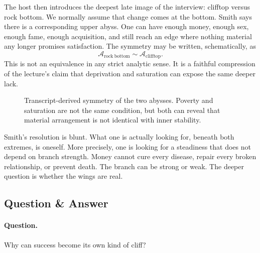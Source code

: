 The host then introduces the deepest late image of the interview: clifftop versus rock bottom. We normally assume that change comes at the bottom. Smith says there is a corresponding upper abyss. One can have enough money, enough sex, enough fame, enough acquisition, and still reach an edge where nothing material any longer promises satisfaction. The symmetry may be written, schematically, as
\begin{equation}
\mathcal A_{\mathrm{rock\ bottom}}
\sim
\mathcal A_{\mathrm{clifftop}}.
\end{equation}
This is not an equivalence in any strict analytic sense. It is a faithful compression of the lecture's claim that deprivation and saturation can expose the same deeper lack.

\begin{figure}[h]
\centering
{}
\caption{Transcript-derived symmetry of the two abysses. Poverty and saturation are not the same condition, but both can reveal that material arrangement is not identical with inner stability.}
\end{figure}

Smith's resolution is blunt. What one is actually looking for, beneath both extremes, is oneself. More precisely, one is looking for a steadiness that does not depend on branch strength. Money cannot cure every disease, repair every broken relationship, or prevent death. The branch can be strong or weak. The deeper question is whether the wings are real.

\subsection{Question \& Answer}

\paragraph{Question.}
Why can success become its own kind of cliff?

